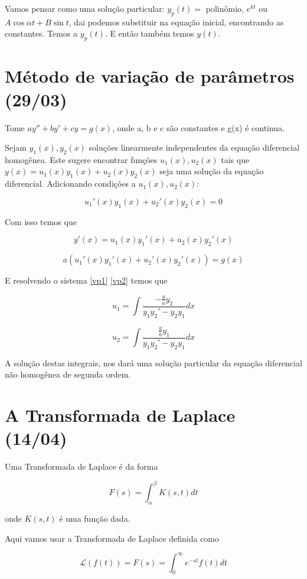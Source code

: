 \documentclass[12pt]{article}
\begin{document}
Vamos pensar como uma solução particular: $y_p(t) = $ polinômio, $e^{k t}$ ou $A \cos \alpha t + B \sin t$, dai podemos substituir na equação inicial, encontrando as constantes. Temos a $y_p(t)$. E então também temos $y(t)$.

\section{Método de variação de parâmetros (29/03)}

Tome $a y'' + b y' + c y = g(x)$, onde a, b e c são constantes e g(x) é continua.

Sejam $y_1(x), y_2(x)$ soluções linearmente independentes da equação diferencial homogênea. Este sugere encontrar funções $u_1(x), u_2(x)$ tais que $y(x) = u_1(x) y_1(x) + u_2(x) y_2(x)$ seja uma solução da equação diferencial. Adicionando condições a $u_1(x), u_2(x)$:

\begin{equation}\label{vp1}
    u_1'(x) y_1(x) + u_2'(x) y_2(x) = 0
\end{equation}

Com isso temos que 

$$y'(x) = u_1(x) y_1'(x) + u_2(x) y_2'(x)$$

\begin{equation}\label{vp2}
    a(u_1'(x) y_1'(x) + u_2'(x) y_2'(x)) = g(x)
\end{equation}

E resolvendo o sistema \ref{vp1} \ref{vp2} temos que

$$u_1 = \int \dfrac{- \frac{g}{a} y_2}{y_1 y_2' - y_2 y_1} d x$$

$$u_2 = \int \dfrac{\frac{g}{a} y_1}{y_1 y_2' - y_2 y_1} d x$$

A solução destas integrais, nos dará uma solução particular da equação diferencial não homogênea de segunda ordem.

\section{A Transformada de Laplace (14/04)}
Uma Transformada de Laplace é da forma

$$F(s) = \int_\alpha^\beta K(s, t) d t$$

onde $K(s, t)$ é uma função dada.

Aqui vamos usar a Transformada de Laplace definida como

$$\mathscr{L}(f(t)) = F(s) = \int_0^\infty e^{ - s t} f(t) d t$$
\end{document}
